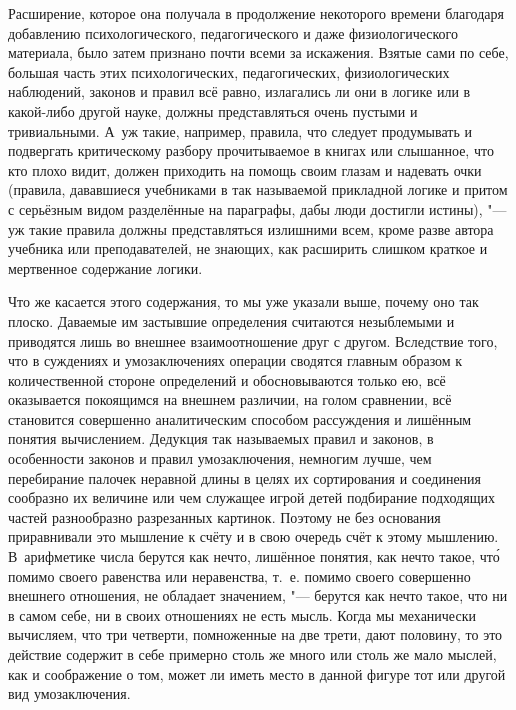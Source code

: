 Расширение, которое она получала в продолжение некоторого времени благодаря
добавлению психологического, педагогического и даже физиологического
материала, было затем признано почти всеми за искажения. Взятые сами по
себе, большая часть этих психологических, педагогических, физиологических
наблюдений, законов и правил всё равно, излагались ли они в логике или в
какой-либо другой науке, должны представляться очень пустыми и
тривиальными. А~уж такие, например, правила, что следует продумывать и
подвергать критическому разбору прочитываемое в книгах или слышанное, что
кто плохо видит, должен приходить на помощь своим глазам и надевать очки
(правила, дававшиеся учебниками в так называемой прикладной логике и притом
с серьёзным видом разделённые на параграфы, дабы люди достигли истины), "---
уж такие правила должны представляться излишними всем, кроме разве автора
учебника или преподавателей, не знающих, как расширить слишком краткое и
мертвенное содержание логики.

Что же касается этого содержания, то мы уже указали выше, почему оно так
плоско. Даваемые им застывшие определения считаются незыблемыми и
приводятся лишь во внешнее взаимоотношение друг с другом. Вследствие того,
что в суждениях и умозаключениях операции сводятся главным образом к
количественной стороне определений и обосновываются только ею, всё
оказывается покоящимся на внешнем различии, на голом сравнении, всё
становится совершенно аналитическим способом рассуждения и лишённым понятия
вычислением. Дедукция так называемых правил и законов, в особенности
законов и правил умозаключения, немногим лучше, чем перебирание палочек
неравной длины в целях их сортирования и соединения сообразно их величине
или чем служащее игрой детей подбирание подходящих частей разнообразно
разрезанных картинок. Поэтому не без основания приравнивали это мышление к
счёту и в свою очередь счёт к этому мышлению. В~арифметике числа берутся
как нечто, лишённое понятия, как нечто такое, чт\'{о} помимо своего равенства
или неравенства, т.~е. помимо своего совершенно внешнего отношения, не
обладает значением, "--- берутся как нечто такое, что ни в самом себе, ни в
своих отношениях не есть мысль. Когда мы механически вычисляем, что три
четверти, помноженные на две трети, дают половину, то это действие содержит
в себе примерно столь же много или столь же мало мыслей, как и соображение
о том, может ли иметь место в данной фигуре тот или другой вид умозаключения.


